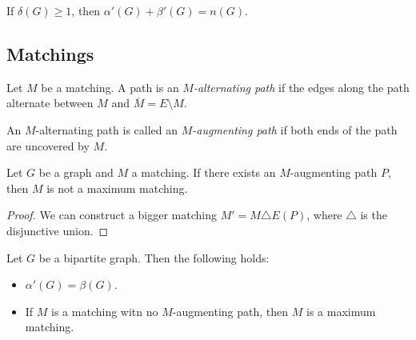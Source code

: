 
\begin{theorem}[Gallai]
    If $\delta(G) \ge 1$, then $\alpha'(G) + \beta'(G) = n(G)$.
\end{theorem}


\subsection{Matchings}

\begin{definition}
    Let $M$ be a matching. A path is an \emph{$M$-alternating path}
    if the edges along the path alternate between $M$ and $\overline{M} = E \setminus M$.
\end{definition}

\begin{definition}
    An $M$-alternating path is called an \emph{$M$-augmenting path}
    if both ends of the path are uncovered by $M$.
\end{definition}


\begin{proposition}
    Let $G$ be a graph and $M$ a matching. If there exists an $M$-augmenting path 
    $P$, then $M$ is not a maximum matching.
\end{proposition}

\begin{proof}
    We can construct a bigger matching $M' = M \triangle E(P)$, where 
    $\triangle$ is the disjunctive union.
\end{proof}

\begin{theorem}[König]
    Let $G$ be a bipartite graph. Then the following holds:
    \begin{itemize}[(a)]
        \item $\alpha'(G) = \beta(G)$.
        \item If $M$ is a matching witn no $M$-augmenting path, then $M$ is a 
        maximum matching.
    \end{itemize}    
\end{theorem}

